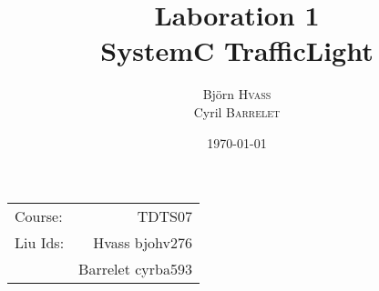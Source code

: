 \documentclass{article}
\title{Laboration 1 \\ SystemC TrafficLight} %
\author{
  Björn \textsc{Hvass}\\
  Cyril \textsc{Barrelet}
} %
\date{\today} %
\begin{document}
\maketitle %

\begin{center}
\begin{tabular}{l r}
Course: & TDTS07\\ %
Liu Ids: & Hvass bjohv276\\ %
& Barrelet cyrba593 \\
\end{tabular}
\end{center}

\pagebreak
\pagebreak
\pagebreak
\pagebreak
\pagebreak






\end{document}
